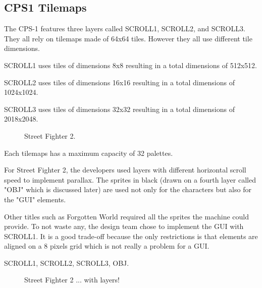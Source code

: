 


\subsection{CPS1 Tilemaps}
The CPS-1 features three layers called SCROLL1, SCROLL2, and SCROLL3. They all rely on tilemaps made of 64x64 tiles. However they all use different tile dimensions. 

SCROLL1 uses tiles of dimensions 8x8 resulting in a total dimensions of 512x512.

SCROLL2 uses tiles of dimensions 16x16 resulting in a total dimensions of 1024x1024.

SCROLL3 uses tiles of dimensions 32x32 resulting in a total dimensions of 2018x2048.


\vfill
\begin{figure}[!b]
 \caption*{Street Fighter 2.}%
 \end{figure}%
\pagebreak

Each tilemaps has a maximum capacity of 32 palettes.

For Street Fighter 2, the developers used layers with different horizontal scroll speed to implement parallax. The sprites in black (drawn on a fourth layer called "OBJ" which is discussed later) are used not only for the characters but also for the "GUI" elements.

Other titles such as Forgotten World required all the sprites the machine could provide. To not waste any, the design team chose to implement the GUI with SCROLL1. It is a good trade-off because the only restrictions is that elements are aligned on a 8 pixels grid which is not really a problem for a GUI.

 SCROLL1,  SCROLL2,  SCROLL3,  OBJ.

\vfill
\begin{figure}[!b]
 \caption*{Street Fighter 2 ... with layers!}%
 \end{figure}%
\pagebreak


